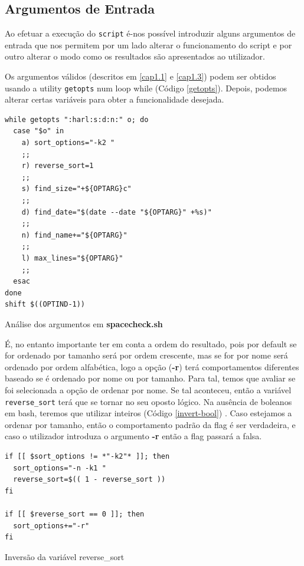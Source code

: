 \subsection{Argumentos de Entrada}
   Ao efetuar a execução do \verb|script| é-nos possível
   introduzir alguns argumentos de entrada que nos permitem
   por um lado alterar o funcionamento do script e por outro
   alterar o modo como os resultados são apresentados ao
   utilizador.

   Os argumentos válidos (descritos em \ref{cap1.1} e
   \ref{cap1.3}) podem ser obtidos usando a utility
   \verb|getopts| num loop while (Código \ref{getopts}). Depois, podemos alterar
   certas variáveis para obter a funcionalidade desejada.

\begin{listing}[H]
\begin{verbatim}
while getopts ":harl:s:d:n:" o; do 
  case "$o" in
    a) sort_options="-k2 "
    ;;
    r) reverse_sort=1
    ;;
    s) find_size="+${OPTARG}c"
    ;;
    d) find_date="$(date --date "${OPTARG}" +%s)"
    ;;
    n) find_name+="${OPTARG}"
    ;;
    l) max_lines="${OPTARG}"
    ;;
  esac
done
shift $((OPTIND-1))
\end{verbatim}
\caption{Análise dos argumentos em \textbf{spacecheck.sh}}
\label{getopts}
\end{listing}

É, no entanto importante ter em conta a ordem do resultado,
pois por default se for ordenado por tamanho
será por ordem crescente, mas se for por nome será ordenado
por ordem alfabética, logo a opção (\textbf{-r}) terá
comportamentos diferentes baseado se é ordenado por nome ou
por tamanho.
Para tal, temos que avaliar se foi selecionada a opção de
ordenar por nome. Se tal aconteceu, então a variável \verb|reverse_sort| terá que se tornar no seu oposto lógico. Na
ausência de boleanos em bash, teremos que utilizar inteiros (Código \ref{invert-bool}) \cite{ebrahim2018mastering}. Caso estejamos a
ordenar por tamanho, então o comportamento padrão da flag é
ser verdadeira, e caso o utilizador introduza o argumento
\textbf{-r} então a flag passará a falsa.
\begin{listing}[H]
\begin{verbatim}
if [[ $sort_options != *"-k2"* ]]; then
  sort_options="-n -k1 "
  reverse_sort=$(( 1 - reverse_sort ))
fi

if [[ $reverse_sort == 0 ]]; then
  sort_options+="-r"
fi
\end{verbatim}
\caption{Inversão da variável reverse\_sort}
\label{invert-bool}
\end{listing}

